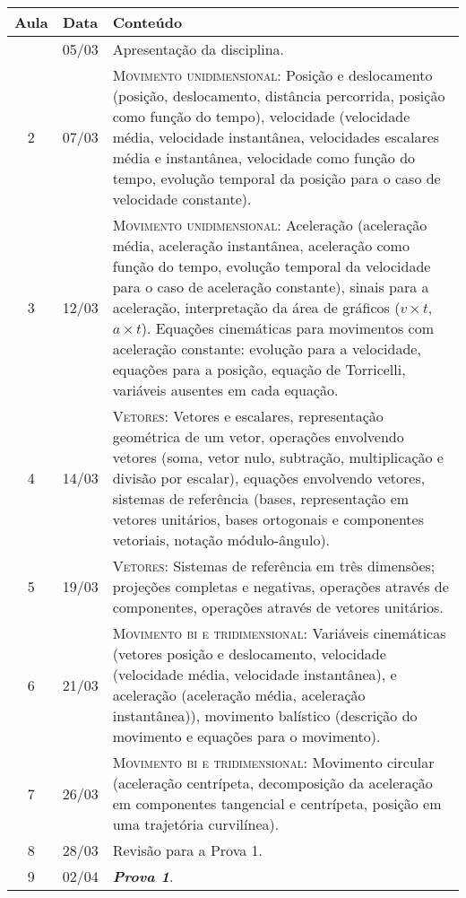 \begin{center}
\begin{longtable}{ccp{70mm}}
\toprule
Aula & Data & Conteúdo \\
\midrule
\endhead
\bottomrule
\endfoot
1	 & 	05/03	 & 	Apresentação da disciplina. \\
2	 & 	07/03	 & 	\textsc{Movimento unidimensional:} Posição e deslocamento (posição, deslocamento, distância percorrida, posição como função do tempo), velocidade (velocidade média, velocidade instantânea, velocidades escalares média e instantânea, velocidade como função do tempo, evolução temporal da posição para o caso de velocidade constante). \\
3	 & 	12/03	 & 	\textsc{Movimento unidimensional:} Aceleração (aceleração média, aceleração instantânea, aceleração como função do tempo, evolução temporal da velocidade para o caso de aceleração constante), sinais para a aceleração, interpretação da área de gráficos ($v \times t$, $a \times  t$). Equações cinemáticas para movimentos com aceleração constante: evolução para a velocidade, equações para a posição, equação de Torricelli, variáveis ausentes em cada equação. \\
4	 & 	14/03	 & 	\textsc{Vetores:} Vetores e escalares, representação geométrica de um vetor, operações envolvendo vetores (soma, vetor nulo, subtração, multiplicação e divisão por escalar), equações envolvendo vetores, sistemas de referência (bases, representação em vetores unitários, bases ortogonais e componentes vetoriais, notação módulo-ângulo). \\
5	 & 	19/03	 &  \textsc{Vetores:} Sistemas de referência em três dimensões; projeções completas e negativas, operações através de componentes, operações através de vetores unitários. \\
6	 & 	21/03	 & 	\textsc{Movimento bi e tridimensional:} Variáveis cinemáticas (vetores posição e deslocamento, velocidade (velocidade média, velocidade instantânea), e aceleração (aceleração média, aceleração instantânea)), movimento balístico (descrição do movimento e equações para o movimento). \\
7	 & 	26/03	 & 	\textsc{Movimento bi e tridimensional:} Movimento circular (aceleração centrípeta, decomposição da aceleração em componentes tangencial e centrípeta, posição em uma trajetória curvilínea). \\
8	 & 	28/03	 & 	Revisão para a Prova 1. \\
9	 & 	02/04	 & 	\textbf{\textit{Prova 1}}. \\

\end{longtable}
\end{center}
